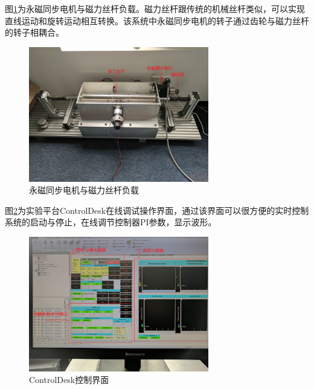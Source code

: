 图\ref{fig:motor}为永磁同步电机与磁力丝杆负载。磁力丝杆\cite{MLS_for_wave,wang_analysis_2011,holm_design_2013}跟传统的机械丝杆类似，可以实现直线运动和旋转运动相互转换。该系统中永磁同步电机的转子通过齿轮与磁力丝杆的转子相耦合。
\begin{figure}[H]
	\centering
	\includegraphics[width=0.7\textwidth]{figs/motor.jpg}
	\caption{永磁同步电机与磁力丝杆负载}
	\label{fig:motor}
\end{figure}
图\ref{fig:ControlDesk}为实验平台ControlDesk在线调试操作界面，通过该界面可以很方便的实时控制系统的启动与停止，在线调节控制器PI参数，显示波形。
\begin{figure}[H]
	\centering
	\includegraphics[width=0.7\textwidth]{figs/ControlDesk.jpg}
	\caption{ControlDesk控制界面}
	\label{fig:ControlDesk}
\end{figure}
